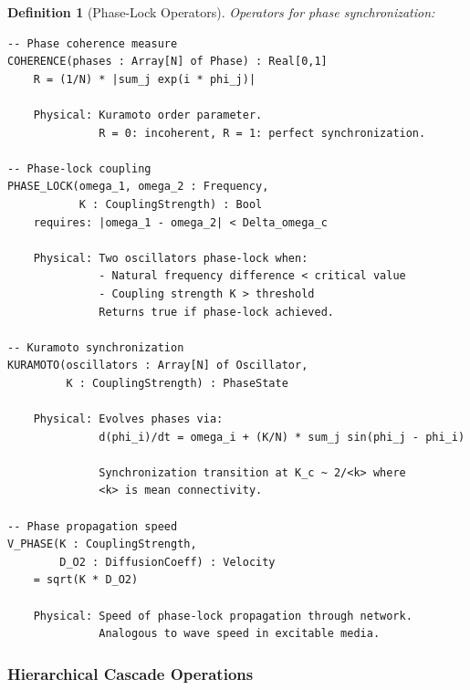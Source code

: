 \documentclass[aps,prd,twocolumn,superscriptaddress,floatfix,nofootinbib]{revtex4-2}
\newtheorem{definition}[theorem]{Definition}
\theoremstyle{remark}
\begin{document}
\begin{definition}[Phase-Lock Operators]
\label{def:phase_lock_ops}
Operators for phase synchronization:
\begin{verbatim}
-- Phase coherence measure
COHERENCE(phases : Array[N] of Phase) : Real[0,1]
    R = (1/N) * |sum_j exp(i * phi_j)|
    
    Physical: Kuramoto order parameter.
              R = 0: incoherent, R = 1: perfect synchronization.

-- Phase-lock coupling
PHASE_LOCK(omega_1, omega_2 : Frequency,
           K : CouplingStrength) : Bool
    requires: |omega_1 - omega_2| < Delta_omega_c
    
    Physical: Two oscillators phase-lock when:
              - Natural frequency difference < critical value
              - Coupling strength K > threshold
              Returns true if phase-lock achieved.

-- Kuramoto synchronization
KURAMOTO(oscillators : Array[N] of Oscillator,
         K : CouplingStrength) : PhaseState
    
    Physical: Evolves phases via:
              d(phi_i)/dt = omega_i + (K/N) * sum_j sin(phi_j - phi_i)
              
              Synchronization transition at K_c ~ 2/<k> where
              <k> is mean connectivity.

-- Phase propagation speed
V_PHASE(K : CouplingStrength,
        D_O2 : DiffusionCoeff) : Velocity
    = sqrt(K * D_O2)
    
    Physical: Speed of phase-lock propagation through network.
              Analogous to wave speed in excitable media.
\end{verbatim}
\end{definition}

\subsubsection{Hierarchical Cascade Operations}
\end{document}
